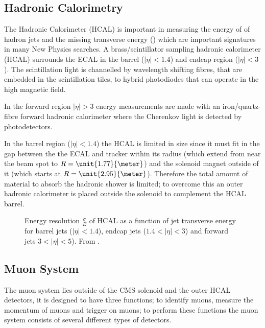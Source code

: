 
\subsection{Hadronic Calorimetry}
The Hadronic Calorimeter (HCAL) is important in measuring the energy of of
hadron jets and the missing transverse energy (\met) which are important
signatures in many New Physics searches.
A brass/scintillator sampling hadronic calorimeter (HCAL) surrounds the ECAL in
the barrel ($|\eta| < 1.4$) and endcap region ($|\eta| < 3$). 
The scintillation light is channelled by wavelength shifting fibres, that are
embedded in the scintillation tiles, to hybrid photodiodes that can operate in
the high magnetic field. \cite{cms}

In the forward region $|\eta| > 3$ energy measurements are made with an
iron/quartz-fibre forward hadronic calorimeter where the Cherenkov light is
detected by photodetectors.\cite{cms}

In the barrel region ($|\eta| < 1.4$) the HCAL is limited in size since it must
fit in the gap between the the ECAL and tracker within its radius (which extend
from near the beam spot to $R = \unit{1.77}{\meter}$) and the solenoid magnet
outside of it (which starts at $R = \unit{2.95}{\meter}$).
Therefore the total amount of material to absorb the hadronic shower is
limited; to overcome this an outer hadronic calorimeter is placed outside the
solenoid to complement the HCAL barrel.\cite{cms}

\begin{figure}[htb!]
  \centering
  \caption{Energy resolution $\frac{\sigma}{E}$ of HCAL as a function of jet
  \label{fig:HCAL}
transverse energy for barrel jets ($|\eta| < 1.4$), endcap jets ($1.4<|\eta| <
3$) and forward jets $3<|\eta| < 5$). From \cite{cms}.}
\end{figure}


\subsection{Muon System}
The muon system lies outside of the CMS solenoid and the outer HCAL detectors,
it is designed to have three functions; to identify muons, measure the momentum
of muons and trigger on muons; to perform these functions the muon system
consists of several different types of detectors. \cite{cms}

